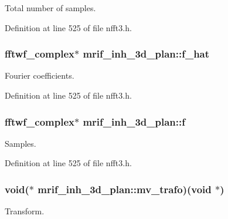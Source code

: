 Total number of samples. 



Definition at line 525 of file nfft3.\-h.

\hypertarget{structmrif__inh__3d__plan_ac644cb0bbceb7ea8634ea94758da405d}{
\subsubsection[{f\-\_\-hat}]{\setlength{\rightskip}{0pt plus 5cm}fftwf\-\_\-complex$\ast$ mrif\-\_\-inh\-\_\-3d\-\_\-plan\-::f\-\_\-hat}}\label{structmrif__inh__3d__plan_ac644cb0bbceb7ea8634ea94758da405d}


Fourier coefficients. 



Definition at line 525 of file nfft3.\-h.

\hypertarget{structmrif__inh__3d__plan_aa762bd3f11d1558e792ff34dc710bcb3}{
\subsubsection[{f}]{\setlength{\rightskip}{0pt plus 5cm}fftwf\-\_\-complex$\ast$ mrif\-\_\-inh\-\_\-3d\-\_\-plan\-::f}}\label{structmrif__inh__3d__plan_aa762bd3f11d1558e792ff34dc710bcb3}


Samples. 



Definition at line 525 of file nfft3.\-h.

\hypertarget{structmrif__inh__3d__plan_a4763b4f8f1b5f574d601289ab3cbcfa8}{
\subsubsection[{mv\-\_\-trafo}]{\setlength{\rightskip}{0pt plus 5cm}void($\ast$ mrif\-\_\-inh\-\_\-3d\-\_\-plan\-::mv\-\_\-trafo)(void $\ast$)}}\label{structmrif__inh__3d__plan_a4763b4f8f1b5f574d601289ab3cbcfa8}


Transform. 



